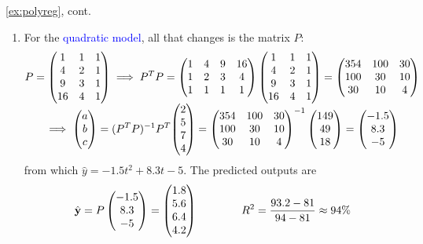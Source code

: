 \begin{example*}{\ref{ex:polyreg}, cont.}
\begin{enumerate}
		\item For the \textcolor{Blue}{quadratic model}, all that changes is the matrix $P$:
		\begin{gather*}
			P=
			\begin{pmatrix}
				1&1&1\\
				4&2&1\\
				9&3&1\\
				16&4&1
			\end{pmatrix}
			\implies P^TP=
			\begin{pmatrix}
				1&4&9&16\\
				1&2&3&4\\
				1&1&1&1
			\end{pmatrix}
			\begin{pmatrix}
				1&1&1\\
				4&2&1\\
				9&3&1\\
				16&4&1
			\end{pmatrix}
			=
			\begin{pmatrix}
				354&100&30\\
				100&30&10\\
				30&10&4
			\end{pmatrix}\\
			\implies \begin{pmatrix}a\\b\\c\end{pmatrix}=(P^TP)^{-1}P^T\smash[t]{\begin{pmatrix}2\\5\\7\\4\end{pmatrix}}=
			\begin{pmatrix}
				354&100&30\\
				100&30&10\\
				30&10&4
			\end{pmatrix}^{-1}
			\begin{pmatrix}149\\49\\18\end{pmatrix}=\begin{pmatrix}-1.5\\8.3\\-5\end{pmatrix}
		\end{gather*}
		from which $\hat y=-1.5t^2+8.3t-5$. The predicted outputs are
		\begin{gather*}
			\hat{{\mathbf{y}}}=P\begin{pmatrix}-1.5\\8.3\\-5\end{pmatrix}=\begin{pmatrix}1.8\\5.6\\6.4\\4.2\end{pmatrix}\qquad\qquad
			R^2=\frac{93.2-81}{94-81} \approx 94\%
		\end{gather*}


\end{enumerate}
\end{example*}
